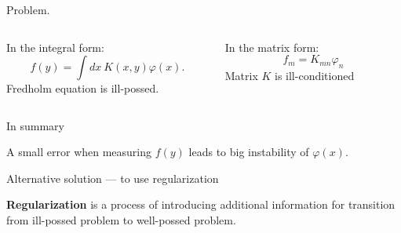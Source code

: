 \documentclass[8pt,pdf,hyperref={unicode}]{beamer}
\begin{document}
\begin{frame}
    \frametitle{}
    
    \begin{block}{Problem.}
        \begin{columns}[c]
            \begin{column}{0.45\textwidth}
            
            {\LARGE
                In the integral form:
                $$
                f(y) = \int dx~ K(x,y)\varphi(x).
                $$
                Fredholm equation is ill-possed.
            }
        \end{column}
                    \vrule{}
                    \hspace{5pt}
            \begin{column}{0.45\textwidth}        
            {\LARGE
                In the matrix form:       
                $$
                f_m = K_{mn}\varphi_n
                $$
                Matrix $K$ is ill-conditioned
            }
        \end{column}
        \end{columns}
     \end{block}
     \begin{block}{In summary}
 \begin{center}
        {\LARGE A small error when measuring $f(y)$ leads to big instability of $\varphi(x)$.}
    \end{center}
\end{block}

     \begin{block}{Alternative solution --- to use regularization}
\begin{center}
             {\LARGE \textbf{Regularization} is a process of introducing additional information for transition from ill-possed problem to well-possed problem.}
\end{center}
        \end{block}
\end{frame}
\end{document}
